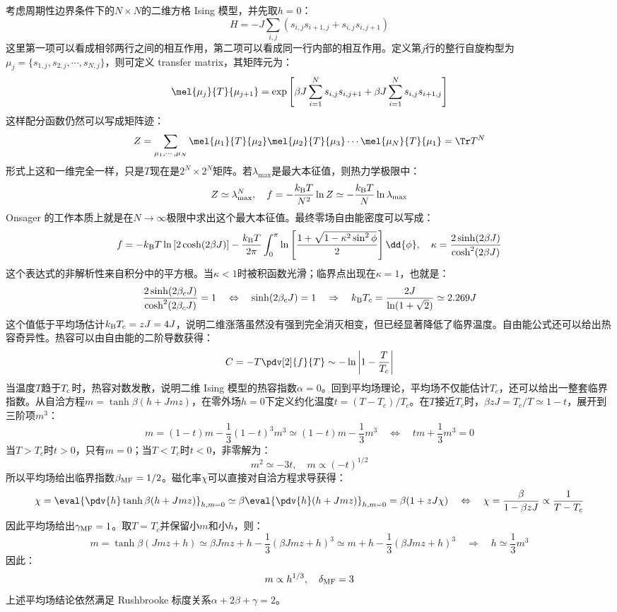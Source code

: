 考虑周期性边界条件下的$N\times N$的二维方格 Ising 模型，并先取$h=0$：
\[H=-J\sum_{i,j}\left(s_{i,j}s_{i+1,j}+s_{i,j}s_{i,j+1}\right)\]
这里第一项可以看成相邻两行之间的相互作用，第二项可以看成同一行内部的相互作用。定义第$j$行的整行自旋构型为$\mu_j=\{s_{1,j},s_{2,j},\cdots,s_{N,j}\}$，则可定义 transfer matrix，其矩阵元为：
\[\mel{\mu_j}{T}{\mu_{j+1}}=\exp\left[\beta J\sum_{i=1}^{N}s_{i,j}s_{i,j+1}+\beta J\sum_{i=1}^{N}s_{i,j}s_{i+1,j}\right]\]
这样配分函数仍然可以写成矩阵迹：
\[Z=\sum_{\mu_1,\cdots,\mu_N}\mel{\mu_1}{T}{\mu_2}\mel{\mu_2}{T}{\mu_3}\cdots\mel{\mu_N}{T}{\mu_1}=\Tr T^N\]
形式上这和一维完全一样，只是$T$现在是$2^N\times2^N$矩阵。若$\lambda_{\max}$是最大本征值，则热力学极限中：
\[Z\simeq \lambda_{\max}^{N},\quad f=-\frac{k_{\rm B}T}{N^2}\ln Z\simeq-\frac{k_{\rm B}T}{N}\ln\lambda_{\max}\]
Onsager 的工作本质上就是在$N\to\infty$极限中求出这个最大本征值。最终零场自由能密度可以写成：
\[f=-k_{\rm B}T\ln\left[2\cosh(2\beta J)\right]-\frac{k_{\rm B}T}{2\pi}\int_0^\pi\ln\left[\frac{1+\sqrt{1-\kappa^2\sin^2\phi}}{2}\right]\dd{\phi}, \quad \kappa=\frac{2\sinh(2\beta J)}{\cosh^2(2\beta J)}\]
这个表达式的非解析性来自积分中的平方根。当$\kappa<1$时被积函数光滑；临界点出现在$\kappa=1$，也就是：
\[\frac{2\sinh(2\beta_cJ)}{\cosh^2(2\beta_cJ)}=1 \quad \Leftrightarrow \quad \sinh(2\beta_cJ)=1 \quad \Rightarrow \quad k_{\rm B}T_c=\frac{2J}{\ln(1+\sqrt2)}\simeq2.269J\]
这个值低于平均场估计$k_{\rm B}T_c=zJ=4J$，说明二维涨落虽然没有强到完全消灭相变，但已经显著降低了临界温度。自由能公式还可以给出热容奇异性。热容可以由自由能的二阶导数获得：
\[C=-T\pdv[2]{f}{T}\sim -\ln\left|1-\frac{T}{T_c}\right|\]
当温度$T$趋于$T_{\rm c}$时，热容对数发散，说明二维 Ising 模型的热容指数$\alpha=0$。回到平均场理论，平均场不仅能估计$T_c$，还可以给出一整套临界指数。从自洽方程$m=\tanh\beta(h+Jmz)$，在零外场$h=0$下定义约化温度$t=(T-T_c)/T_c$。在$T$接近$T_c$时，$\beta zJ=T_c/T\simeq1-t$，展开到三阶项$m^3$：
\[m=(1-t)m-\frac{1}{3}(1-t)^3m^3 \simeq (1-t)m-\frac{1}{3}m^3 \quad \Leftrightarrow \quad tm+\frac{1}{3}m^3=0\]
当$T>T_c$时$t>0$，只有$m=0$；当$T<T_c$时$t<0$，非零解为：
\[m^2\simeq-3t,\quad m\propto(-t)^{1/2}\]
所以平均场给出临界指数$\beta_{\rm MF}=1/2$。磁化率$\chi$可以直接对自洽方程求导获得：
\[\chi=\eval{\pdv{h}\tanh\beta(h+Jmz)}_{h,m=0}\simeq\beta\eval{\pdv{h}(h+Jmz)}_{h,m=0}=\beta(1+zJ\chi) \quad \Leftrightarrow \quad \chi=\frac{\beta}{1-\beta zJ}\propto\frac{1}{T-T_c}\]
因此平均场给出$\gamma_{\rm MF}=1$。取$T=T_c$并保留小$m$和小$h$，则：
\[m=\tanh\beta(Jmz+h)\simeq \beta Jmz+h-\frac{1}{3}(\beta Jmz+h)^3\simeq m+h-\frac{1}{3}(\beta Jmz+h)^3 \quad \Rightarrow \quad h\simeq\frac{1}{3}m^3\]
因此：
\[m\propto h^{1/3},\quad \delta_{\rm MF}=3\]
上述平均场结论依然满足 Rushbrooke 标度关系$\alpha+2\beta+\gamma=2$。

